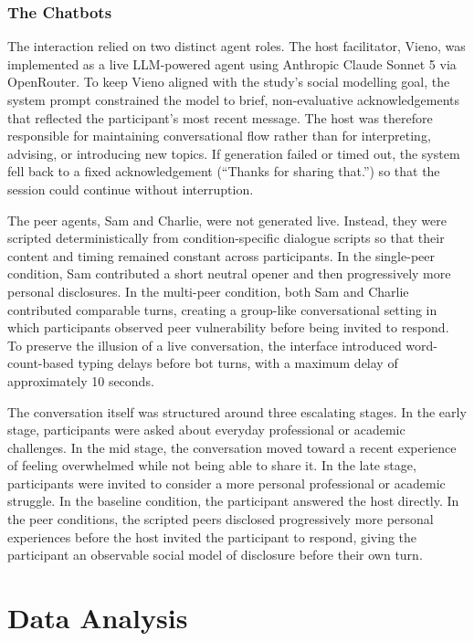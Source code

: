 \documentclass[sigconf]{acmart}
\begin{document}
\subsubsection{The Chatbots}
The interaction relied on two distinct agent roles. The host facilitator, Vieno, was implemented as a live LLM-powered agent using Anthropic Claude Sonnet 5 via OpenRouter. To keep Vieno aligned with the study's social modelling goal, the system prompt constrained the model to brief, non-evaluative acknowledgements that reflected the participant's most recent message. The host was therefore responsible for maintaining conversational flow rather than for interpreting, advising, or introducing new topics. If generation failed or timed out, the system fell back to a fixed acknowledgement (``Thanks for sharing that.'') so that the session could continue without interruption.

The peer agents, Sam and Charlie, were not generated live. Instead, they were scripted deterministically from condition-specific dialogue scripts so that their content and timing remained constant across participants. In the single-peer condition, Sam contributed a short neutral opener and then progressively more personal disclosures. In the multi-peer condition, both Sam and Charlie contributed comparable turns, creating a group-like conversational setting in which participants observed peer vulnerability before being invited to respond. To preserve the illusion of a live conversation, the interface introduced word-count-based typing delays before bot turns, with a maximum delay of approximately 10 seconds.

The conversation itself was structured around three escalating stages. In the early stage, participants were asked about everyday professional or academic challenges. In the mid stage, the conversation moved toward a recent experience of feeling overwhelmed while not being able to share it. In the late stage, participants were invited to consider a more personal professional or academic struggle. In the baseline condition, the participant answered the host directly. In the peer conditions, the scripted peers disclosed progressively more personal experiences before the host invited the participant to respond, giving the participant an observable social model of disclosure before their own turn.

\section{Data Analysis}
\end{document}
